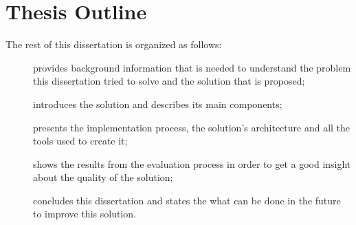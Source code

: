 \section{Thesis Outline}
\label{sec:introduction_thesis_outline}
The rest of this dissertation is organized as follows:
\begin{description}
  \item[]
  provides background information that is needed to understand the problem this dissertation tried to solve and the solution that is proposed;
  \item[]
  introduces the solution and describes its main components;
  \item[]
  presents the implementation process, the solution's architecture and all the tools used to create it;
  \item[]
  shows the results from the evaluation process in order to get a good insight about the quality of the solution;
  \item[]
  concludes this dissertation and states the what can be done in the future to improve this solution.
\end{description}
